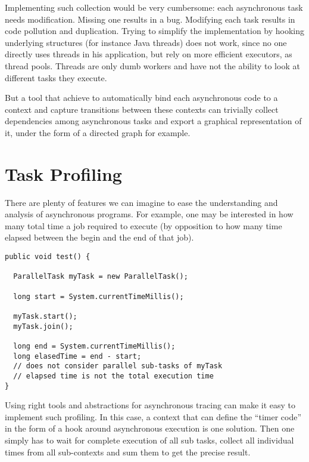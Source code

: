 Implementing such collection would be very cumbersome: each asynchronous task needs modification. Missing one results in a bug. Modifying each task results in code pollution and duplication. Trying to simplify the implementation by hooking underlying structures (for instance Java threads) does not work, since no one directly uses threads in his application, but rely on more efficient executors, as thread pools. Threads are only dumb workers and have not the ability to look at different tasks they execute.

But a tool that achieve to automatically bind each asynchronous code to a context and capture transitions between these contexts can trivially collect dependencies among asynchronous tasks and export a graphical representation of it, under the form of a directed graph for example.

\section{Task Profiling}

There are plenty of features we can imagine to ease the understanding and analysis of asynchronous programs. For example, one may be interested in how many total time a job required to execute (by opposition to how many time elapsed between the begin and the end of that job).

\begin{lstlisting}
public void test() {
  
  ParallelTask myTask = new ParallelTask();

  long start = System.currentTimeMillis();

  myTask.start();
  myTask.join();

  long end = System.currentTimeMillis();
  long elasedTime = end - start;
  // does not consider parallel sub-tasks of myTask
  // elapsed time is not the total execution time
}
\end{lstlisting}

Using right tools and abstractions for asynchronous tracing can make it easy to implement such profiling. In this case, a context that can define the ``timer code'' in the form of a hook around asynchronous execution is one solution. Then one simply has to wait for complete execution of all sub tasks, collect all individual times from all sub-contexts and sum them to get the precise result.

